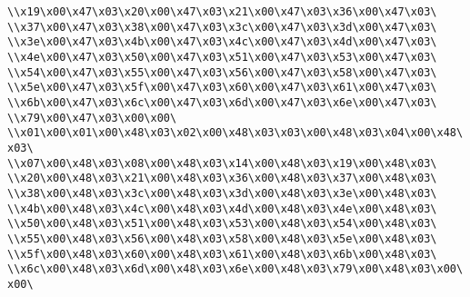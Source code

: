 \verb|\\x19\x00\x47\x03\x20\x00\x47\x03\x21\x00\x47\x03\x36\x00\x47\x03\|\newline
\verb|\\x37\x00\x47\x03\x38\x00\x47\x03\x3c\x00\x47\x03\x3d\x00\x47\x03\|\newline
\verb|\\x3e\x00\x47\x03\x4b\x00\x47\x03\x4c\x00\x47\x03\x4d\x00\x47\x03\|\newline
\verb|\\x4e\x00\x47\x03\x50\x00\x47\x03\x51\x00\x47\x03\x53\x00\x47\x03\|\newline
\verb|\\x54\x00\x47\x03\x55\x00\x47\x03\x56\x00\x47\x03\x58\x00\x47\x03\|\newline
\verb|\\x5e\x00\x47\x03\x5f\x00\x47\x03\x60\x00\x47\x03\x61\x00\x47\x03\|\newline
\verb|\\x6b\x00\x47\x03\x6c\x00\x47\x03\x6d\x00\x47\x03\x6e\x00\x47\x03\|\newline
\verb|\\x79\x00\x47\x03\x00\x00\|\newline
\verb|\\x01\x00\x01\x00\x48\x03\x02\x00\x48\x03\x03\x00\x48\x03\x04\x00\x48\x03\|\newline
\verb|\\x07\x00\x48\x03\x08\x00\x48\x03\x14\x00\x48\x03\x19\x00\x48\x03\|\newline
\verb|\\x20\x00\x48\x03\x21\x00\x48\x03\x36\x00\x48\x03\x37\x00\x48\x03\|\newline
\verb|\\x38\x00\x48\x03\x3c\x00\x48\x03\x3d\x00\x48\x03\x3e\x00\x48\x03\|\newline
\verb|\\x4b\x00\x48\x03\x4c\x00\x48\x03\x4d\x00\x48\x03\x4e\x00\x48\x03\|\newline
\verb|\\x50\x00\x48\x03\x51\x00\x48\x03\x53\x00\x48\x03\x54\x00\x48\x03\|\newline
\verb|\\x55\x00\x48\x03\x56\x00\x48\x03\x58\x00\x48\x03\x5e\x00\x48\x03\|\newline
\verb|\\x5f\x00\x48\x03\x60\x00\x48\x03\x61\x00\x48\x03\x6b\x00\x48\x03\|\newline
\verb|\\x6c\x00\x48\x03\x6d\x00\x48\x03\x6e\x00\x48\x03\x79\x00\x48\x03\x00\x00\|\newline
